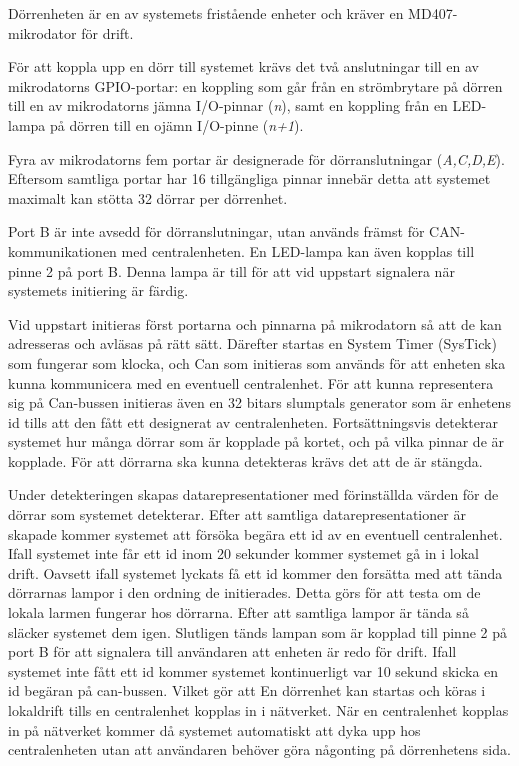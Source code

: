 \documentclass{article}
\begin{document}
Dörrenheten är en av systemets fristående enheter och kräver en MD407-mikrodator för drift.

För att koppla upp en dörr till systemet krävs det två anslutningar till en av mikrodatorns
 GPIO-portar: en koppling som går från en strömbrytare på dörren till en av mikrodatorns jämna
  I/O-pinnar (\textit{n}), samt en koppling från en LED-lampa på dörren till en ojämn I/O-pinne (\textit{n+1}).

Fyra av mikrodatorns fem portar är designerade för dörranslutningar (\textit{A,C,D,E}). \\
Eftersom samtliga portar har 16 tillgängliga pinnar innebär detta att systemet maximalt kan stötta 32 dörrar per dörrenhet.

Port B är inte avsedd för dörranslutningar, utan används främst för CAN-\\kommunikationen
med centralenheten. En LED-lampa kan även kopplas till \\ pinne 2 på port B. Denna lampa är
till för att vid uppstart signalera när systemets initiering är färdig.

Vid uppstart initieras först portarna och pinnarna på mikrodatorn så att de kan adresseras
och avläsas på rätt sätt. Därefter startas en System Timer (SysTick) som fungerar som klocka, och
Can som initieras som används för att enheten ska kunna kommunicera
med en eventuell centralenhet. För att kunna representera sig på Can-bussen initieras även
en 32 bitars slumptals generator som är enhetens id tills att den fått ett designerat av
centralenheten. Fortsättningsvis detekterar systemet hur många dörrar som är kopplade 
på kortet, och på vilka pinnar de är kopplade. För att dörrarna ska kunna detekteras krävs det att
 de är stängda.

Under detekteringen skapas datarepresentationer med förinställda värden för de dörrar som systemet
detekterar. Efter att samtliga datarepresentationer är skapade kommer systemet att försöka begära 
ett id av en eventuell centralenhet. Ifall systemet inte får ett id inom 20 sekunder kommer systemet 
gå in i lokal drift. Oavsett ifall systemet lyckats få ett id kommer den forsätta med att tända dörrarnas lampor
i den ordning de initierades. Detta görs för att testa om de lokala larmen fungerar hos dörrarna.
Efter att samtliga lampor är tända så släcker systemet dem igen.
Slutligen tänds lampan som är kopplad till pinne 2 på port B för att signalera till användaren att enheten är redo för drift.
Ifall systemet inte fått ett id kommer systemet kontinuerligt var 10 sekund skicka en
id begäran på can-bussen. Vilket gör att En dörrenhet kan startas och köras i lokaldrift
tills en centralenhet kopplas in i nätverket. När en centralenhet kopplas in på nätverket
kommer då systemet automatiskt att dyka upp hos centralenheten utan att användaren behöver
göra någonting på dörrenhetens sida.
\end{document}
